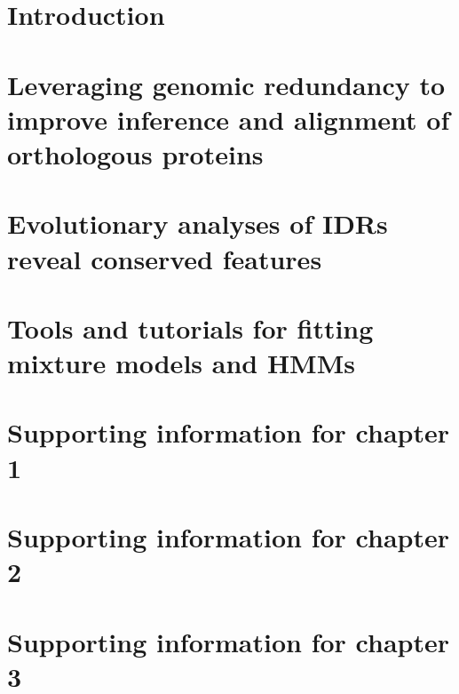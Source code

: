 \documentclass[11pt,letterpaper,oneside]{book}
\renewcommand{\thefigure}{\thechapter.\arabic{figure}}
\newlength{\promptwidth}
\begin{document}
\tableofcontents
\clearpage  %
\setcounter{chapter}{-1}  %
\setcounter{page}{1}  %

\chapter{Introduction}
\label{chapter:0}
\graphicspath{{chapter0/figures/}}


\chapter{Leveraging genomic redundancy to improve inference and alignment of orthologous proteins}
\label{chapter:1}
\graphicspath{{chapter1/figures/}}


\chapter{Evolutionary analyses of IDRs reveal conserved features}
\label{chapter:2}
\graphicspath{{chapter2/figures/}}


\chapter{Tools and tutorials for fitting mixture models and HMMs}
\label{chapter:3}
\graphicspath{{chapter3/}}



\printbibliography[heading=bibintoc, title=References]  %

\appendix
\setcounter{figure}{0}
\renewcommand{\thefigure}{\thechapter\arabic{figure}}
\setcounter{table}{0}
\renewcommand{\thetable}{\thechapter\arabic{table}}

\chapter{Supporting information for chapter 1}
\label{appendix:a}
\graphicspath{{chapter1/figures/}}


\chapter{Supporting information for chapter 2}
\label{appendix:b}
\graphicspath{{chapter2/figures/}}


\chapter{Supporting information for chapter 3}
\label{appendix:c}
\setlength{\promptwidth}{0in}  %

\end{document}
